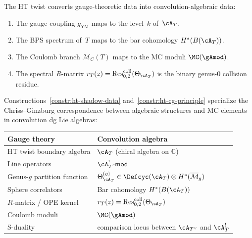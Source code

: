 \begin{construction}
\label{constr:ht-cg-principle}
The HT twist converts gauge-theoretic data into convolution-algebraic
data:
\begin{enumerate}[label=\textup{(\roman*)}]
\item The gauge coupling $g_{\mathrm{YM}}$ maps to the level~$k$
 of~$\cA_T$.
\item The BPS spectrum of~$T$ maps to the bar cohomology
 $H^*(B(\cA_T))$.
\item The Coulomb branch $\mathcal{M}_C(T)$ maps to the MC moduli
 $\MC(\gAmod)$.
\item The spectral $R$-matrix
 $r_T(z) = \operatorname{Res}^{\mathrm{coll}}_{0,2}(\Theta_{\cA_T})$
 is the binary genus-$0$ collision residue.
\end{enumerate}
\end{construction}

\begin{remark}[Dictionary]
\label{rem:ht-cg-dictionary}
Constructions~\ref{constr:ht-shadow-data} and~\ref{constr:ht-cg-principle} specialize the Chriss--Ginzburg
correspondence between algebraic structures and MC elements in
convolution dg Lie algebras:
\begin{center}
\renewcommand{\arraystretch}{1.2}
\begin{tabular}{ll}
\toprule
\textbf{Gauge theory} & \textbf{Convolution algebra} \\
\midrule
HT twist boundary algebra & $\cA_T$ (chiral algebra on $\mathbb{C}$) \\
Line operators & $\cA_T^!\text{-}\mathsf{mod}$ \\
Genus-$g$ partition function &
$\Theta_{\cA_T}^{(g)} \in \Defcyc(\cA_T) \otimes
H^*(\overline{\mathcal{M}}_g)$ \\
Sphere correlators & Bar cohomology $H^*(B(\cA_T))$ \\
$R$-matrix / OPE kernel &
$r_T(z) = \operatorname{Res}^{\mathrm{coll}}_{0,2}(\Theta_{\cA_T})$ \\
Coulomb moduli & $\MC(\gAmod)$ \\
S-duality & comparison locus between $\cA_{T^\vee}$ and $\cA_T^!$ \\
\bottomrule
\end{tabular}
\end{center}
\end{remark}

